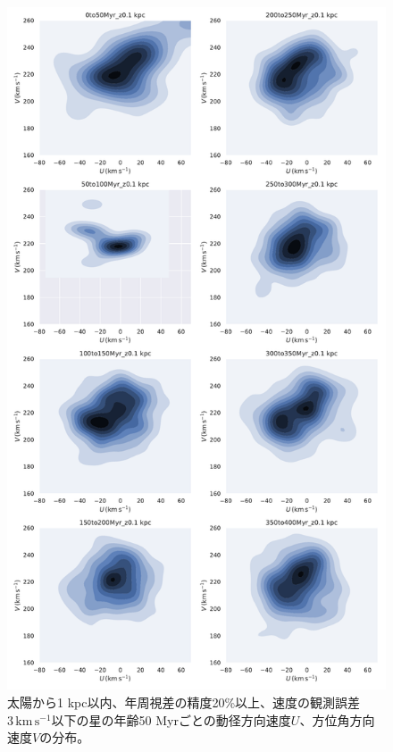 \begin{figure}[htbp]
\begin{center}
	\includegraphics[width=12cm]{fig/UV/hist_seaborn_2_z0.1kpc.pdf}
	\caption{太陽から1 kpc以内、年周視差の精度20\%以上、速度の観測誤差$3\,\mathrm{km\,s^{-1}}$以下の星の年齢50 Myrごとの動径方向速度$U$、方位角方向速度$V$の分布。}
	\label{hist_seaborn_50Myr}
\end{center}
\end{figure}

